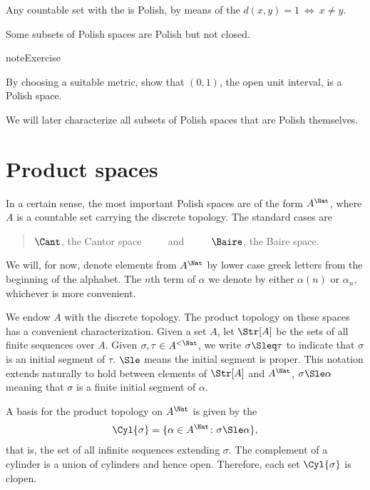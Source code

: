 \documentclass[letterpaper,10pt,english]{jupyterBook}
\begin{document}
\sphinxAtStartPar
Any countable set with the  is Polish, by means of the  \(d(x,y) = 1 \: \Leftrightarrow \: x \neq y\).

\sphinxAtStartPar
Some subsets of Polish spaces are Polish but not closed.

\begin{sphinxadmonition}{note}{Exercise}

\sphinxAtStartPar
By choosing a suitable metric, show that \((0,1)\), the open unit interval, is a Polish space.
\end{sphinxadmonition}

\sphinxAtStartPar
We will later characterize all subsets of Polish spaces that are Polish themselves.


\section{Product spaces}
\label{\detokenize{polish:product-spaces}}\label{\detokenize{polish:polish-product-spaces}}
\sphinxAtStartPar
In a certain sense, the most important Polish spaces are of the form \(A^\Nat\), where \(A\) is a countable set carrying the discrete topology. The standard cases are
\begin{quote}

\sphinxAtStartPar
\(\Cant\), the Cantor space \(\qquad\) and \(\qquad\) \(\Baire\), the Baire space.
\end{quote}

\sphinxAtStartPar
We will, for now, denote elements from \(A^\Nat\) by lower case greek letters from the beginning of the alphabet. The \(n\)\sphinxhyphen{}th term of \(\alpha\) we denote by either \(\alpha(n)\) or \(\alpha_n\), whichever is more convenient.

\sphinxAtStartPar
We endow \(A\) with the discrete topology.
The product topology on these spaces has a convenient characterization. Given a set \(A\), let \(\Str[A]\) be the sets of all finite sequences over \(A\).
Given \(\sigma, \tau \in A^{<\Nat}\), we write \(\sigma \Sleq \tau\) to indicate that \(\sigma\) is an initial segment of \(\tau\). \(\Sle\) means the initial segment is proper. This notation extends naturally to hold between elements of \(\Str[A]\) and \(A^\Nat\), \(\sigma \Sle \alpha\) meaning that \(\sigma\) is a finite initial segment of \(\alpha\).

\sphinxAtStartPar
A basis for the product topology on \(A^\Nat\) is given by the 
\begin{equation*}
\begin{split}
\Cyl{\sigma} = \{\alpha \in A^\Nat \colon \sigma \Sle \alpha \},
\end{split}
\end{equation*}
\sphinxAtStartPar
that is, the set of all infinite sequences extending \(\sigma\). The complement of a cylinder is a union of cylinders and hence open. Therefore, each set \(\Cyl{\sigma}\) is clopen.
\end{document}
